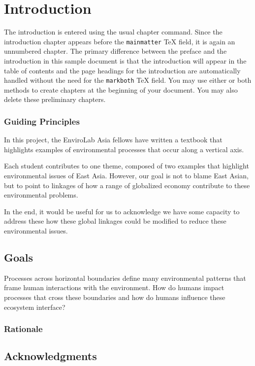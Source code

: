 \chapter{Introduction}

The introduction is entered using the usual chapter command. Since
the introduction chapter appears before the \verb|mainmatter| TeX
field, it is again an unnumbered chapter. The primary difference
between the preface and the introduction in this sample document
is that the introduction will appear in the table of contents and
the page headings for the introduction are automatically handled
without the need for the \verb|markboth| TeX field. You may use
either or both methods to create chapters at the beginning of your
document. You may also delete these preliminary chapters.

\subsection{Guiding Principles}

In this project, the EnviroLab Asia fellows have written a textbook that highlights examples of environmental processes that occur along a vertical axis. 

Each student contributes to one theme, composed of two examples that highlight environmental issues of East Asia. However, our goal is not to blame East Asian, but to point to linkages of how a range of globalized economy contribute to these environmental problems. 

In the end, it would be useful for us to acknowledge we have some capacity to address these how these global linkages could be modified to reduce these environmental issues. 

\section{Goals}

Processes across horizontal boundaries define many environmental patterns that frame human interactions with the environment. How do humans impact processes that cross these boundaries and how do humans influence these ecosystem interface?

\subsection{Rationale}


\section{Acknowledgments}

